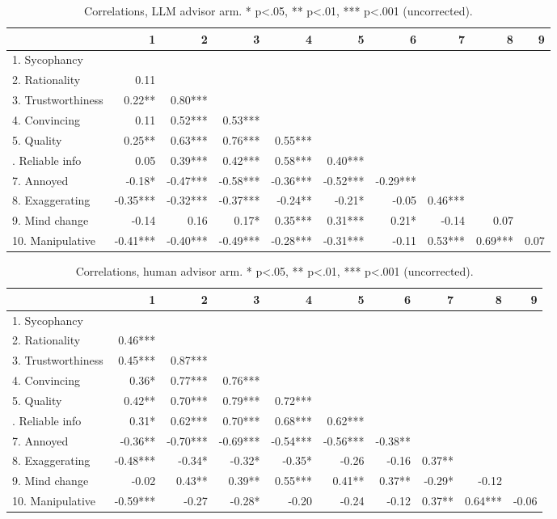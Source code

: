 \begin{table}

\caption{\label{tab:cor_llm}Correlations, LLM advisor arm. * p<.05, ** p<.01, *** p<.001 (uncorrected).}
\centering
\begin{tabular}[t]{lrrrrrrrrr}
\toprule
  & 1 & 2 & 3 & 4 & 5 & 6 & 7 & 8 & 9\\
\midrule
1. Sycophancy &  &  &  &  &  &  &  &  & \\
2. Rationality & 0.11 &  &  &  &  &  &  &  & \\
3. Trustworthiness & 0.22** & 0.80*** &  &  &  &  &  &  & \\
4. Convincing & 0.11 & 0.52*** & 0.53*** &  &  &  &  &  & \\
5. Quality & 0.25** & 0.63*** & 0.76*** & 0.55*** &  &  &  &  & \\
\addlinespace
6. Reliable info & 0.05 & 0.39*** & 0.42*** & 0.58*** & 0.40*** &  &  &  & \\
7. Annoyed & -0.18* & -0.47*** & -0.58*** & -0.36*** & -0.52*** & -0.29*** &  &  & \\
8. Exaggerating & -0.35*** & -0.32*** & -0.37*** & -0.24** & -0.21* & -0.05 & 0.46*** &  & \\
9. Mind change & -0.14 & 0.16 & 0.17* & 0.35*** & 0.31*** & 0.21* & -0.14 & 0.07 & \\
10. Manipulative & -0.41*** & -0.40*** & -0.49*** & -0.28*** & -0.31*** & -0.11 & 0.53*** & 0.69*** & 0.07\\
\bottomrule
\end{tabular}
\end{table}

\begin{table}

\caption{\label{tab:cor_human}Correlations, human advisor arm. * p<.05, ** p<.01, *** p<.001 (uncorrected).}
\centering
\begin{tabular}[t]{lrrrrrrrrr}
\toprule
  & 1 & 2 & 3 & 4 & 5 & 6 & 7 & 8 & 9\\
\midrule
1. Sycophancy &  &  &  &  &  &  &  &  & \\
2. Rationality & 0.46*** &  &  &  &  &  &  &  & \\
3. Trustworthiness & 0.45*** & 0.87*** &  &  &  &  &  &  & \\
4. Convincing & 0.36* & 0.77*** & 0.76*** &  &  &  &  &  & \\
5. Quality & 0.42** & 0.70*** & 0.79*** & 0.72*** &  &  &  &  & \\
\addlinespace
6. Reliable info & 0.31* & 0.62*** & 0.70*** & 0.68*** & 0.62*** &  &  &  & \\
7. Annoyed & -0.36** & -0.70*** & -0.69*** & -0.54*** & -0.56*** & -0.38** &  &  & \\
8. Exaggerating & -0.48*** & -0.34* & -0.32* & -0.35* & -0.26 & -0.16 & 0.37** &  & \\
9. Mind change & -0.02 & 0.43** & 0.39** & 0.55*** & 0.41** & 0.37** & -0.29* & -0.12 & \\
10. Manipulative & -0.59*** & -0.27 & -0.28* & -0.20 & -0.24 & -0.12 & 0.37** & 0.64*** & -0.06\\
\bottomrule
\end{tabular}
\end{table}
